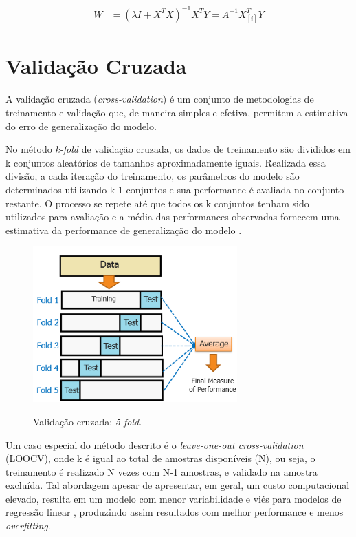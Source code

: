 \begin{equation}\begin{split}
    W &= (\lambda I + X^TX)^{-1}X^TY = A^{-1}X_{[i]}^TY
    \label{eq:lsnormal_reg}
\end{split}\end{equation}



\section{Validação Cruzada}

A validação cruzada (\textit{cross-validation}) é um conjunto de metodologias de treinamento e validação que, de maneira simples e efetiva, permitem a estimativa do erro de generalização do modelo.

No método \textit{k-fold} de validação cruzada, os dados de treinamento são divididos em k conjuntos aleatórios de tamanhos aproximadamente iguais. Realizada essa divisão, a cada iteração do treinamento, os parâmetros do modelo são determinados utilizando k-1 conjuntos e sua performance é avaliada no conjunto restante. O processo se repete até que todos os k conjuntos tenham sido utilizados para avaliação e a média das performances observadas fornecem uma estimativa da performance de generalização do modelo \cite{overfitting_crossval}.

\begin{figure}[H]
    \centering
    \caption{Validação cruzada: \textit{5-fold}.}
    \includegraphics[width=0.7\textwidth]{imgs/rev/cross_validation}
    \label{fig:dim_perf}
\end{figure}

Um caso especial do método descrito é o \textit{leave-one-out cross-validation} (LOOCV), onde k é igual ao total de 
amostras disponíveis (N), ou seja, o treinamento é realizado N vezes com N-1 amostras, e validado na amostra excluída.
 Tal abordagem apesar de apresentar, em geral, um custo computacional elevado, resulta em um modelo com menor 
 variabilidade e viés para modelos de regressão linear \cite{burman}, produzindo assim resultados com melhor 
 performance e menos \textit{overfitting}.

